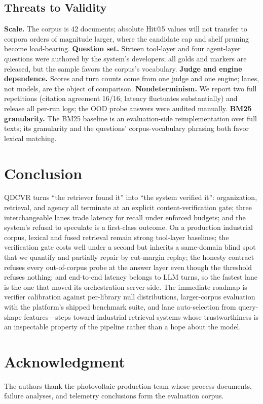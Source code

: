 \documentclass[journal]{IEEEtran}
\begin{document}
\subsection{Threats to Validity}
\textbf{Scale.} The corpus is 42 documents; absolute Hit@5 values will
not transfer to corpora orders of magnitude larger, where the candidate
cap and shelf pruning become load-bearing. \textbf{Question set.} Sixteen
tool-layer and four agent-layer questions were authored by the system's
developers; all golds and markers are released, but the sample favors the
corpus's vocabulary. \textbf{Judge and engine dependence.} Scores and
turn counts come from one judge and one engine; lanes, not models, are
the object of comparison. \textbf{Nondeterminism.} We report two full
repetitions (citation agreement 16/16; latency fluctuates substantially)
and release all per-run logs; the OOD probe answers were audited
manually. \textbf{BM25 granularity.} The BM25 baseline is an
evaluation-side reimplementation over full texts; its granularity and
the questions' corpus-vocabulary phrasing both favor lexical matching.

\section{Conclusion}
QDCVR turns ``the retriever found it'' into ``the system verified it'':
organization, retrieval, and agency all terminate at an explicit
content-verification gate; three interchangeable lanes trade latency for
recall under enforced budgets; and the system's refusal to speculate is a
first-class outcome. On a production industrial corpus, lexical and fused
retrieval remain strong tool-layer baselines; the verification gate costs
well under a second but inherits a same-domain blind spot that we
quantify and partially repair by cut-margin replay; the honesty contract
refuses every out-of-corpus probe at the answer layer even though the
threshold refuses nothing; and end-to-end latency belongs to LLM turns,
so the fastest lane is the one that moved its orchestration
server-side. The immediate roadmap is verifier calibration against
per-library null distributions, larger-corpus evaluation with the
platform's shipped benchmark suite, and lane auto-selection from
query-shape features---steps toward industrial retrieval systems whose
trustworthiness is an inspectable property of the pipeline rather than a
hope about the model.

\section*{Acknowledgment}
The authors thank the photovoltaic production team whose process
documents, failure analyses, and telemetry conclusions form the
evaluation corpus. %



\end{document}
